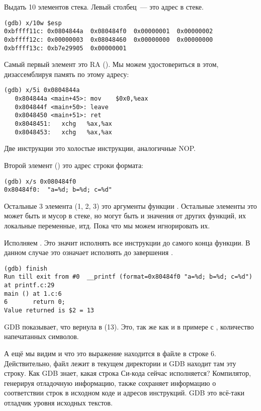 Выдать 10 элементов стека. Левый столбец~--- это адрес в стеке.

\begin{lstlisting}
(gdb) x/10w $esp
0xbffff11c:	0x0804844a	0x080484f0	0x00000001	0x00000002
0xbffff12c:	0x00000003	0x08048460	0x00000000	0x00000000
0xbffff13c:	0xb7e29905	0x00000001
\end{lstlisting}

Самый первый элемент это \ac{RA} ().
Мы можем удостовериться в этом, дизассемблируя память по этому адресу:

\begin{lstlisting}[label=NOP_as_XCHG_example,style=customasm]
(gdb) x/5i 0x0804844a
   0x804844a <main+45>:	mov    $0x0,%eax
   0x804844f <main+50>:	leave  
   0x8048450 <main+51>:	ret    
   0x8048451:	xchg   %ax,%ax
   0x8048453:	xchg   %ax,%ax
\end{lstlisting}

Две инструкции  это холостые инструкции, аналогичные \ac{NOP}.

Второй элемент () это адрес строки формата:

\begin{lstlisting}
(gdb) x/s 0x080484f0
0x80484f0:	"a=%d; b=%d; c=%d"
\end{lstlisting}

Остальные 3 элемента (1, 2, 3) это аргументы функции \printf.
Остальные элементы это может быть и мусор в стеке, но могут быть и значения
от других функций, их локальные переменные, итд.
Пока что мы можем игнорировать их.

Исполняем . 
Это значит исполнять все инструкции до самого конца функции. 
В данном случае это означает исполнять до завершения \printf.

\begin{lstlisting}
(gdb) finish
Run till exit from #0  __printf (format=0x80484f0 "a=%d; b=%d; c=%d") at printf.c:29
main () at 1.c:6
6		return 0;
Value returned is $2 = 13
\end{lstlisting}

\ac{GDB} показывает, что вернула \printf в \EAX (13).
Это, так же как и в примере с \olly, количество напечатанных символов.

А ещё мы видим  и что это выражение находится в файле  в строке 6.
Действительно, файл  лежит в текущем директории и \ac{GDB} находит там эту строку.
Как \ac{GDB} знает, какая строка Си-кода сейчас исполняется?
Компилятор, генерируя отладочную информацию, также сохраняет информацию о соответствии строк в исходном коде и адресов инструкций.
GDB это всё-таки отладчик уровня исходных текстов.

